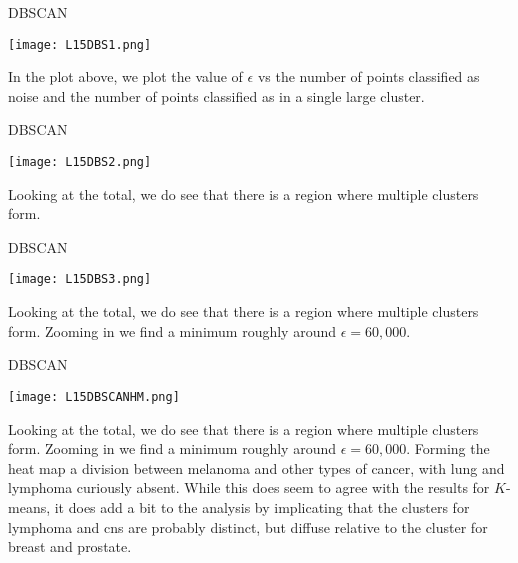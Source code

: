 \documentclass[10pt, table, dvipsnames,xcdraw,handout]{beamer}
\begin{document}
\begin{frame}[fragile]{DBSCAN}
  \begin{minipage}[t][0.5\textheight][t]{\textwidth}
	\centering \texttt{[image: L15DBS1.png]} 
  \end{minipage}
  \vfill
\begin{minipage}[t][0.5\textheight][t]{\textwidth}
In the plot above, we plot the value of $\epsilon$ vs the number of points classified as noise and the number of points classified as in a single large cluster. 
\end{minipage}
\end{frame}



\begin{frame}[fragile]{DBSCAN}
  \begin{minipage}[t][0.5\textheight][t]{\textwidth}
	\centering \texttt{[image: L15DBS2.png]} 
  \end{minipage}
  \vfill
\begin{minipage}[t][0.5\textheight][t]{\textwidth}
Looking at the total, we do see that there is a region where multiple clusters form.
\end{minipage}
\end{frame}


\begin{frame}[fragile]{DBSCAN}
  \begin{minipage}[t][0.5\textheight][t]{\textwidth}
	\centering \texttt{[image: L15DBS3.png]} 
  \end{minipage}
  \vfill
\begin{minipage}[t][0.5\textheight][t]{\textwidth}
Looking at the total, we do see that there is a region where multiple clusters form. Zooming in we find a minimum roughly around $\epsilon = 60,000$. 
\end{minipage}
\end{frame}


\begin{frame}[fragile]{DBSCAN}
  \begin{minipage}[t][0.5\textheight][t]{\textwidth}
	\centering \texttt{[image: L15DBSCANHM.png]} 
  \end{minipage}
  \vfill
\begin{minipage}[t][0.5\textheight][t]{\textwidth}
Looking at the total, we do see that there is a region where multiple clusters form. Zooming in we find a minimum roughly around $\epsilon = 60,000$.  Forming the heat map a division between melanoma and other types of cancer, with lung and lymphoma curiously absent. While this does seem to agree with the results for $K$-means, it does add a bit to the analysis by implicating that the clusters for lymphoma and cns are probably distinct, but diffuse relative to the cluster for breast and prostate. 
\end{minipage}
\end{frame}
\end{document}

